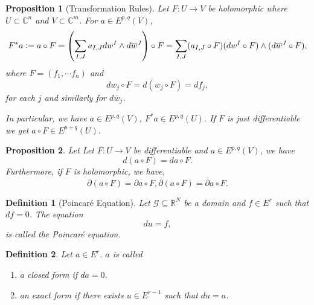 \documentclass{article}
\newtheorem{proposition}{Proposition}[section]
\newtheorem{definition}{Definition}[section]
\newcommand{\defeq}{\vcentcolon=}
\newcommand{\R}[0]{\mathbb{R}}
\newcommand{\C}[0]{\mathbb{C}}
\begin{document}
\begin{proposition}[Transformation Rules]
  Let $F:U\to V$ be holomorphic where $U\subset\C^n$ and $V\subset\C^m$. For $a\in E^{p,q}(V)$, 
  \begin{equation*}
    F^*a \defeq a\circ F = \left(\sum_{I,J} a_{I,J} dw^I\wedge d\overline{w}^J\right)\circ F  = \sum_{I,J} (a_{I,J}\circ F) (dw^I\circ F)\wedge (d\overline{w}^J\circ F),
  \end{equation*}
  where $F=(f_1,\cdots f_n)$ and 
  \begin{equation*}
    dw_j\circ F = d(w_j\circ F)=df_j,
  \end{equation*}
  for each $j$ and similarly for $d\overline{w}_j$. 
  \par In particular, we have $a\in E^{p,q}(V)$, $F^*a \in E^{p,q}(U)$. If $F$ is just differentiable we get $a\circ F\in E^{p+q}(U)$.
\end{proposition}

\begin{proposition}
  Let  Let $F:U\to V$ be differentiable and $a\in E^{p,q}(V)$, we have 
  \begin{equation*}
    d(a\circ F) = da\circ F. 
  \end{equation*}
  Furthermore, if $F$ is holomorphic, we have,
  \begin{equation*}
    \partial (a\circ F) = \partial a\circ F, \overline{\partial}(a\circ F) = \overline{\partial}a \circ F.
  \end{equation*}
\end{proposition}

\begin{definition}[Poincaré Equation]
  Let $\mathcal{G}\subseteq\R^N$ be a domain and $f\in E^r$ such that $df = 0$. The equation 
  \begin{equation*}
    du = f,
  \end{equation*}
  is called the Poincaré equation.
\end{definition}

\begin{definition}
  Let $a\in E^r$. $a$ is called
  \begin{enumerate}[1).]
    \item a closed form if $da = 0$.
    \item an exact form if there exists $u\in E^{r-1}$ such that $du = a$.
  \end{enumerate}  
\end{definition}
\end{document}
